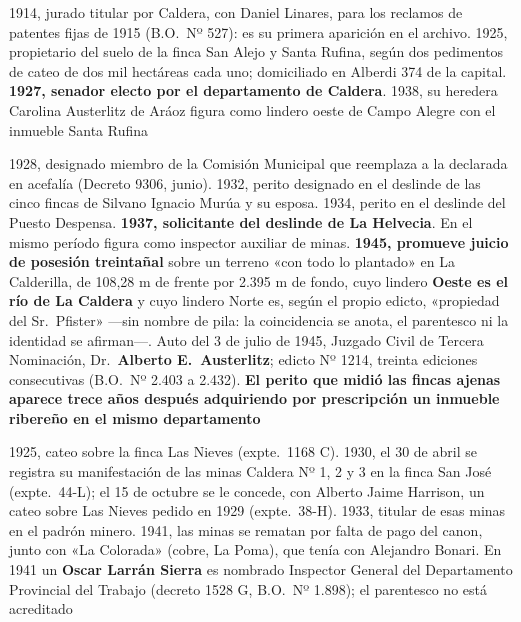 \begin{personas}
\item[{\textbf{Bernardo Austerlitz\index{Austerlitz, Bernardo}}}] 1914, jurado titular por Caldera, con Daniel Linares, para los reclamos de patentes fijas de 1915 (B.O.\ Nº 527): es su primera aparición en el archivo. 1925, propietario del suelo de la finca San Alejo y Santa Rufina, según dos pedimentos de cateo de dos mil hectáreas cada uno; domiciliado en Alberdi 374 de la capital. \textbf{1927, senador electo por el departamento de Caldera}. 1938, su heredera Carolina Austerlitz de Aráoz figura como lindero oeste de Campo Alegre con el inmueble Santa Rufina

\item[{\textbf{Hermann Pfister\index{Pfister, Hermann}}}] 1928, designado miembro de la Comisión Municipal que reemplaza a la declarada en acefalía (Decreto 9306, junio). 1932, perito designado en el deslinde de las cinco fincas de Silvano Ignacio Murúa y su esposa. 1934, perito en el deslinde del Puesto Despensa. \textbf{1937, solicitante del deslinde de La Helvecia}. En el mismo período figura como inspector auxiliar de minas. \textbf{1945, promueve juicio de posesión treintañal} sobre un terreno «con todo lo plantado» en La Calderilla, de 108,28 m de frente por 2.395 m de fondo, cuyo lindero \textbf{Oeste es el río de La Caldera} y cuyo lindero Norte es, según el propio edicto, «propiedad del Sr.\ Pfister» ---sin nombre de pila: la coincidencia se anota, el parentesco ni la identidad se afirman---. Auto del 3 de julio de 1945, Juzgado Civil de Tercera Nominación, Dr.\ \textbf{Alberto E.\ Austerlitz}; edicto Nº 1214, treinta ediciones consecutivas (B.O.\ Nº 2.403 a 2.432). \textbf{El perito que midió las fincas ajenas aparece trece años después adquiriendo por prescripción un inmueble ribereño en el mismo departamento}

\item[{\textbf{Juan Larrán\index{Larrán, Juan}}}] 1925, cateo sobre la finca Las Nieves (expte.\ 1168 C). 1930, el 30 de abril se registra su manifestación de las minas Caldera Nº 1, 2 y 3 en la finca San José (expte.\ 44-L); el 15 de octubre se le concede, con Alberto Jaime Harrison, un cateo sobre Las Nieves pedido en 1929 (expte.\ 38-H). 1933, titular de esas minas en el padrón minero. 1941, las minas se rematan por falta de pago del canon, junto con «La Colorada» (cobre, La Poma), que tenía con Alejandro Bonari. En 1941 un \textbf{Oscar Larrán Sierra} es nombrado Inspector General del Departamento Provincial del Trabajo (decreto 1528 G, B.O.\ Nº 1.898); el parentesco no está acreditado


\end{personas}
